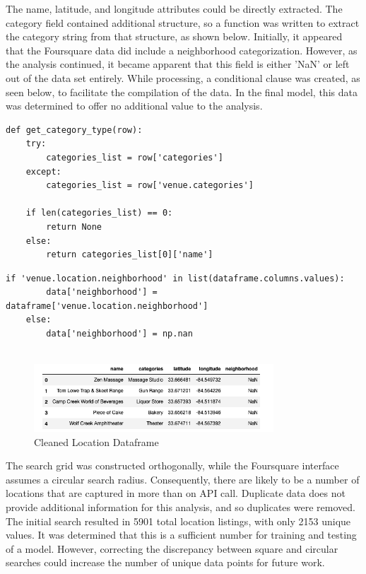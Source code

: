 \documentclass[11pt]{amsart}
\begin{document}
The name, latitude, and longitude attributes could be directly extracted. The category field contained additional structure, so a function was written to extract the category string from that structure, as shown below. 
Initially, it appeared that the Foursquare data did include a neighborhood categorization. However, as the analysis continued, it became apparent that this field is either 'NaN' or left out of the data set entirely. While processing, a conditional clause was created, as seen below, to facilitate the compilation of the data.  In the final model, this data was determined to offer no additional value to the analysis. 

\lstset{language=Python}
\begin{lstlisting}[caption={Category Extraction Function}]
def get_category_type(row):
    try:
        categories_list = row['categories']
    except:
        categories_list = row['venue.categories']
        
    if len(categories_list) == 0:
        return None
    else:
        return categories_list[0]['name']
\end{lstlisting}

\begin{lstlisting}[caption={Neighborhood Data Screening Clause}]
 if 'venue.location.neighborhood' in list(dataframe.columns.values):
        data['neighborhood'] = dataframe['venue.location.neighborhood']
    else: 
        data['neighborhood'] = np.nan
        
\end{lstlisting}
\begin{figure}
\includegraphics[width=0.8\textwidth]{Foursquare_API_output_table_cleaned}
\caption{Cleaned Location Dataframe}
\label{tab:fsclean}
\end{figure}

The search grid was constructed orthogonally, while the Foursquare interface assumes a circular search radius. Consequently, there are likely to be a number of locations that are captured in more than on API call. Duplicate data does not provide additional information for this analysis, and so duplicates were removed. The initial search resulted in 5901 total location listings, with only 2153 unique values. It was determined that this is a sufficient number for training and testing of a model. However, correcting the discrepancy between square and circular searches could increase the number of unique data points for future work. 
\FloatBarrier
\end{document}
